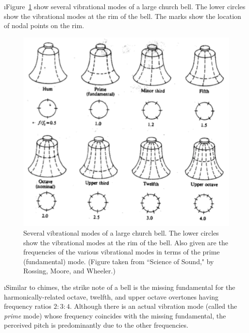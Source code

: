 \i Figure~\ref{f:bell} show several vibrational
modes of a large church bell.
The lower circles show the vibrational modes at the
rim of the bell.
The marks show the location of nodal points on the rim.
%
\begin{figure}[htbp]
\begin{center}
\includegraphics[width=.8\textwidth]{bell.pdf}
\caption{
Several vibrational modes of a large church bell.
The lower circles show the vibrational modes at the
rim of the bell.
Also given are the frequencies of the various
vibrational modes in terms of the prime (fundamental) mode.
(Figure taken from ``Science of Sound," by
Rossing, Moore, and Wheeler.)}
\label{f:bell}
\end{center}
\end{figure}
%

\i Similar to chimes, the strike note of a bell is the 
missing fundamental for the harmonically-related 
octave, twelfth, and upper octave overtones having
frequency ratios $2:3:4$.
Although there is an actual vibration mode (called the
{\em prime} mode) whose 
frequency coincides with the missing fundamental, 
the perceived pitch is predominantly due to the other
frequencies.

\ei

